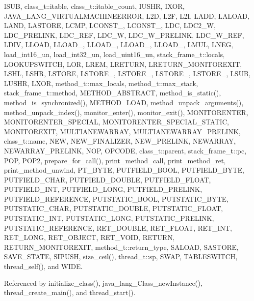 ISUB, class\_\-t::itable, class\_\-t::itable\_\-count, IUSHR, IXOR, JAVA\_\-LANG\_\-VIRTUALMACHINEERROR, L2D, L2F, L2I, LADD, LALOAD, LAND, LASTORE, LCMP, LCONST\_, LCONST\_, LDC, LDC2\_\-W, LDC\_\-PRELINK, LDC\_\-REF, LDC\_\-W, LDC\_\-W\_\-PRELINK, LDC\_\-W\_\-REF, LDIV, LLOAD, LLOAD\_, LLOAD\_, LLOAD\_, LLOAD\_, LMUL, LNEG, load\_\-int16\_\-un, load\_\-int32\_\-un, load\_\-uint16\_\-un, stack\_\-frame\_\-t::locals, LOOKUPSWITCH, LOR, LREM, LRETURN, LRETURN\_\-MONITOREXIT, LSHL, LSHR, LSTORE, LSTORE\_, LSTORE\_, LSTORE\_, LSTORE\_, LSUB, LUSHR, LXOR, method\_\-t::max\_\-locals, method\_\-t::max\_\-stack, stack\_\-frame\_\-t::method, METHOD\_\-ABSTRACT, method\_\-is\_\-static(), method\_\-is\_\-synchronized(), METHOD\_\-LOAD, method\_\-unpack\_\-arguments(), method\_\-unpack\_\-index(), monitor\_\-enter(), monitor\_\-exit(), MONITORENTER, MONITORENTER\_\-SPECIAL, MONITORENTER\_\-SPECIAL\_\-STATIC, MONITOREXIT, MULTIANEWARRAY, MULTIANEWARRAY\_\-PRELINK, class\_\-t::name, NEW, NEW\_\-FINALIZER, NEW\_\-PRELINK, NEWARRAY, NEWARRAY\_\-PRELINK, NOP, OPCODE, class\_\-t::parent, stack\_\-frame\_\-t::pc, POP, POP2, prepare\_\-for\_\-call(), print\_\-method\_\-call, print\_\-method\_\-ret, print\_\-method\_\-unwind, PT\_\-BYTE, PUTFIELD\_\-BOOL, PUTFIELD\_\-BYTE, PUTFIELD\_\-CHAR, PUTFIELD\_\-DOUBLE, PUTFIELD\_\-FLOAT, PUTFIELD\_\-INT, PUTFIELD\_\-LONG, PUTFIELD\_\-PRELINK, PUTFIELD\_\-REFERENCE, PUTSTATIC\_\-BOOL, PUTSTATIC\_\-BYTE, PUTSTATIC\_\-CHAR, PUTSTATIC\_\-DOUBLE, PUTSTATIC\_\-FLOAT, PUTSTATIC\_\-INT, PUTSTATIC\_\-LONG, PUTSTATIC\_\-PRELINK, PUTSTATIC\_\-REFERENCE, RET\_\-DOUBLE, RET\_\-FLOAT, RET\_\-INT, RET\_\-LONG, RET\_\-OBJECT, RET\_\-VOID, RETURN, RETURN\_\-MONITOREXIT, method\_\-t::return\_\-type, SALOAD, SASTORE, SAVE\_\-STATE, SIPUSH, size\_\-ceil(), thread\_\-t::sp, SWAP, TABLESWITCH, thread\_\-self(), and WIDE.



Referenced by initialize\_\-class(), java\_\-lang\_\-Class\_\-newInstance(), thread\_\-create\_\-main(), and thread\_\-start().


